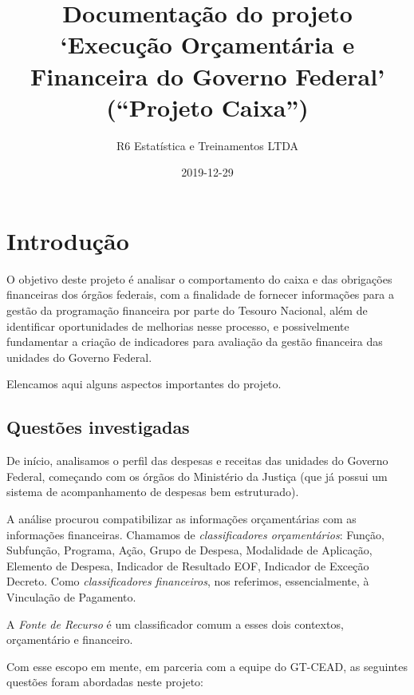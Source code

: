 \documentclass[]{book}
\title{Documentação do projeto `Execução Orçamentária e Financeira do Governo Federal' (``Projeto Caixa'')}
\author{R6 Estatística e Treinamentos LTDA}
\date{2019-12-29}
\begin{document}
\maketitle

{
\setcounter{tocdepth}{1}
\tableofcontents
}
\hypertarget{introducao}{%
\chapter{Introdução}\label{introducao}}

O objetivo deste projeto é analisar o comportamento do caixa e das obrigações financeiras dos órgãos federais, com a finalidade de fornecer informações para a gestão da programação financeira por parte do Tesouro Nacional, além de identificar oportunidades de melhorias nesse processo, e possivelmente fundamentar a criação de indicadores para avaliação da gestão financeira das unidades do Governo Federal.

Elencamos aqui alguns aspectos importantes do projeto.

\hypertarget{questoes-investigadas}{%
\section{Questões investigadas}\label{questoes-investigadas}}

De início, analisamos o perfil das despesas e receitas das unidades do Governo Federal, começando com os órgãos do Ministério da Justiça (que já possui um sistema de acompanhamento de despesas bem estruturado).

A análise procurou compatibilizar as informações orçamentárias com as informações financeiras. Chamamos de \emph{classificadores orçamentários}: Função, Subfunção, Programa, Ação, Grupo de Despesa, Modalidade de Aplicação, Elemento de Despesa, Indicador de Resultado EOF, Indicador de Exceção Decreto. Como \emph{classificadores financeiros}, nos referimos, essencialmente, à Vinculação de Pagamento.

A \emph{Fonte de Recurso} é um classificador comum a esses dois contextos, orçamentário e financeiro.

Com esse escopo em mente, em parceria com a equipe do GT-CEAD, as seguintes questões foram abordadas neste projeto:
\end{document}
